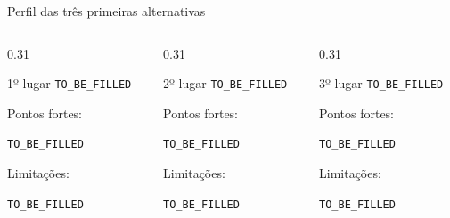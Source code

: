 \begin{frame}{Perfil das três primeiras alternativas}

    \begin{columns}[T]

        \begin{column}{0.31\textwidth}

            \begin{block}{1º lugar}
                \texttt{TO\_BE\_FILLED}

                \vspace{0.2cm}

                Pontos fortes:

                \texttt{TO\_BE\_FILLED}

                \vspace{0.2cm}

                Limitações:

                \texttt{TO\_BE\_FILLED}
            \end{block}

        \end{column}


        \begin{column}{0.31\textwidth}

            \begin{block}{2º lugar}
                \texttt{TO\_BE\_FILLED}

                \vspace{0.2cm}

                Pontos fortes:

                \texttt{TO\_BE\_FILLED}

                \vspace{0.2cm}

                Limitações:

                \texttt{TO\_BE\_FILLED}
            \end{block}

        \end{column}


        \begin{column}{0.31\textwidth}

            \begin{block}{3º lugar}
                \texttt{TO\_BE\_FILLED}

                \vspace{0.2cm}

                Pontos fortes:

                \texttt{TO\_BE\_FILLED}

                \vspace{0.2cm}

                Limitações:

                \texttt{TO\_BE\_FILLED}
            \end{block}

        \end{column}

    \end{columns}

\end{frame}


